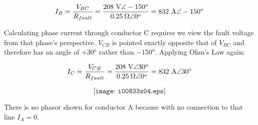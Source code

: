 $$I_B = {V_{BC} \over R_{fault}} = {208 \hbox{ V} \angle -150^o \over 0.25 \> \Omega \angle 0^o} = 832 \hbox{ A} \angle -150^o$$

Calculating phase current through conductor C requires we view the fault voltage from that phase's perspective.  $V_{CB}$ is pointed exactly opposite that of $V_{BC}$ and therefore has an angle of +30$^{o}$ rather than $-150^o$.  Applying Ohm's Law again:

$$I_C = {V_{CB} \over R_{fault}} = {208 \hbox{ V} \angle 30^o \over 0.25 \> \Omega \angle 0^o} = 832 \hbox{ A} \angle 30^o$$

$$\texttt{[image: i00833x04.eps]}$$

There is no phasor shown for conductor A because with no connection to that line $I_A = 0$.











